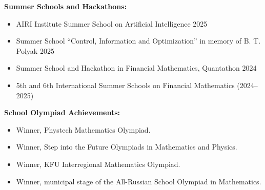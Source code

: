 \documentclass[a4paper, fontsize=11pt]{article}
\begin{document}
\textbf{Summer Schools and Hackathons:}
\begin{itemize}
    \item AIRI Institute Summer School on Artificial Intelligence 2025
    \item Summer School “Control, Information and Optimization” in memory of B. T. Polyak 2025
    \item Summer School and Hackathon in Financial Mathematics, Quantathon 2024
    \item 5th and 6th International Summer Schools on Financial Mathematics (2024--2025)
\end{itemize}

\textbf{School Olympiad Achievements:}
\begin{itemize}
    \item Winner, Phystech Mathematics Olympiad.
    \item Winner, Step into the Future Olympiads in Mathematics and Physics.
    \item Winner, KFU Interregional Mathematics Olympiad.
    \item Winner, municipal stage of the All-Russian School Olympiad in Mathematics.
\end{itemize}
\end{document}
